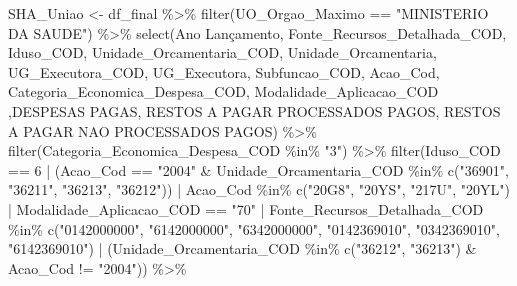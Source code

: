 \documentclass[
  letterpaper,
  DIV=11,
  numbers=noendperiod]{scrartcl}
\newenvironment{Shaded}{\begin{snugshade}}{\end{snugshade}}
\newcommand{\AttributeTok}[1]{\textcolor[rgb]{0.40,0.45,0.13}{#1}}
\newcommand{\DecValTok}[1]{\textcolor[rgb]{0.68,0.00,0.00}{#1}}
\newcommand{\FunctionTok}[1]{\textcolor[rgb]{0.28,0.35,0.67}{#1}}
\newcommand{\NormalTok}[1]{\textcolor[rgb]{0.00,0.23,0.31}{#1}}
\newcommand{\OtherTok}[1]{\textcolor[rgb]{0.00,0.23,0.31}{#1}}
\newcommand{\SpecialCharTok}[1]{\textcolor[rgb]{0.37,0.37,0.37}{#1}}
\newcommand{\StringTok}[1]{\textcolor[rgb]{0.13,0.47,0.30}{#1}}
\begin{document}
\begin{Shaded}
\begin{Highlighting}[]
\NormalTok{SHA\_Uniao }\OtherTok{\textless{}{-}}\NormalTok{ df\_final }\SpecialCharTok{\%\textgreater{}\%} 
  \FunctionTok{filter}\NormalTok{(UO\_Orgao\_Maximo }\SpecialCharTok{==} \StringTok{"MINISTERIO DA SAUDE"}\NormalTok{) }\SpecialCharTok{\%\textgreater{}\%} 
  \FunctionTok{select}\NormalTok{(}\StringTok{\textasciigrave{}}\AttributeTok{Ano Lançamento}\StringTok{\textasciigrave{}}\NormalTok{, Fonte\_Recursos\_Detalhada\_COD, Iduso\_COD, Unidade\_Orcamentaria\_COD, Unidade\_Orcamentaria, UG\_Executora\_COD, UG\_Executora, Subfuncao\_COD, Acao\_Cod, Categoria\_Economica\_Despesa\_COD, Modalidade\_Aplicacao\_COD ,}\StringTok{\textasciigrave{}}\AttributeTok{DESPESAS PAGAS}\StringTok{\textasciigrave{}}\NormalTok{, }\StringTok{\textasciigrave{}}\AttributeTok{RESTOS A PAGAR PROCESSADOS PAGOS}\StringTok{\textasciigrave{}}\NormalTok{, }\StringTok{\textasciigrave{}}\AttributeTok{RESTOS A PAGAR NAO PROCESSADOS PAGOS}\StringTok{\textasciigrave{}}\NormalTok{) }\SpecialCharTok{\%\textgreater{}\%} 
  \FunctionTok{filter}\NormalTok{(Categoria\_Economica\_Despesa\_COD }\SpecialCharTok{\%in\%} \StringTok{"3"}\NormalTok{) }\SpecialCharTok{\%\textgreater{}\%} 
  \FunctionTok{filter}\NormalTok{(Iduso\_COD }\SpecialCharTok{==} \DecValTok{6} \SpecialCharTok{|}\NormalTok{ (Acao\_Cod }\SpecialCharTok{==} \StringTok{"2004"} \SpecialCharTok{\&}\NormalTok{ Unidade\_Orcamentaria\_COD }\SpecialCharTok{\%in\%} \FunctionTok{c}\NormalTok{(}\StringTok{"36901"}\NormalTok{, }\StringTok{"36211"}\NormalTok{, }\StringTok{"36213"}\NormalTok{, }\StringTok{"36212"}\NormalTok{)) }\SpecialCharTok{|}\NormalTok{ Acao\_Cod }\SpecialCharTok{\%in\%} \FunctionTok{c}\NormalTok{(}\StringTok{"20G8"}\NormalTok{, }\StringTok{"20YS"}\NormalTok{, }\StringTok{"217U"}\NormalTok{, }\StringTok{"20YL"}\NormalTok{) }\SpecialCharTok{|}\NormalTok{ Modalidade\_Aplicacao\_COD }\SpecialCharTok{==} \StringTok{"70"} \SpecialCharTok{|}\NormalTok{ Fonte\_Recursos\_Detalhada\_COD }\SpecialCharTok{\%in\%} \FunctionTok{c}\NormalTok{(}\StringTok{"0142000000"}\NormalTok{, }\StringTok{"6142000000"}\NormalTok{, }\StringTok{"6342000000"}\NormalTok{, }\StringTok{"0142369010"}\NormalTok{, }\StringTok{"0342369010"}\NormalTok{, }\StringTok{"6142369010"}\NormalTok{) }\SpecialCharTok{|}\NormalTok{ (Unidade\_Orcamentaria\_COD }\SpecialCharTok{\%in\%} \FunctionTok{c}\NormalTok{(}\StringTok{"36212"}\NormalTok{, }\StringTok{"36213"}\NormalTok{) }\SpecialCharTok{\&}\NormalTok{ Acao\_Cod }\SpecialCharTok{!=} \StringTok{"2004"}\NormalTok{)) }\SpecialCharTok{\%\textgreater{}\%} 

\end{Highlighting}
\end{Shaded}
\end{document}
